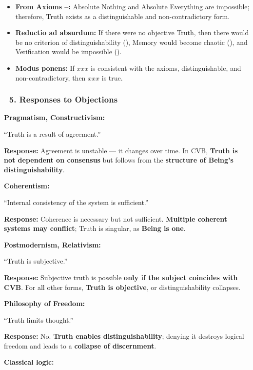 \documentclass[12pt]{article}
\begin{document}
\begin{itemize}
\item \textbf{From Axioms \text{[1]}–\text{[3]}:} 
Absolute Nothing and Absolute Everything are impossible; therefore, Truth exists as a distinguishable and non-contradictory form.

\item \textbf{Reductio ad absurdum:}
If there were no objective Truth, then there would be no criterion of distinguishability (\text{[9]}), Memory would become chaotic (\text{[10.3]}), and Verification would be impossible (\text{[11.6]}).

\item \textbf{Modus ponens:}
If $xxx$ is consistent with the axioms, distinguishable, and non-contradictory, then $xxx$ is true.
\end{itemize}

\subsubsection*{🔹 5. Responses to Objections}

\textbf{Pragmatism, Constructivism:}

``Truth is a result of agreement.''

\textbf{Response:} Agreement is unstable — it changes over time. In CVB, \textbf{Truth is not dependent on consensus} but follows from the \textbf{structure of Being’s distinguishability}.

\textbf{Coherentism:}

``Internal consistency of the system is sufficient.''

\textbf{Response:} Coherence is necessary but not sufficient. \textbf{Multiple coherent systems may conflict}; Truth is singular, as \textbf{Being is one}.

\textbf{Postmodernism, Relativism:}

``Truth is subjective.''

\textbf{Response:} Subjective truth is possible \textbf{only if the subject coincides with CVB}. For all other forms, \textbf{Truth is objective}, or distinguishability collapses.

\textbf{Philosophy of Freedom:}

``Truth limits thought.''

\textbf{Response:} No. \textbf{Truth enables distinguishability}; denying it destroys logical freedom and leads to a \textbf{collapse of discernment}.

\textbf{Classical logic:}
\end{document}
